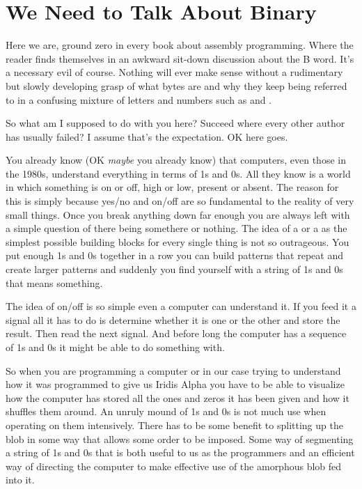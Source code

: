 \chapter{We Need to Talk About Binary} 
\lstset{style=6502Style}

Here we are, ground zero in every book about assembly programming. Where the reader
finds themselves in an awkward sit-down discussion about the B word. It's a necessary evil
of course. Nothing will ever make sense without a rudimentary but slowly developing
grasp of what bytes are and why they keep being referred to in a confusing mixture
of letters and numbers such as  and .

So what am I supposed to do with you here? Succeed where every other author has
usually failed? I assume that's the expectation. OK here goes.

You already know (OK \textit{maybe} you already know) that computers, even those in the 
1980s, understand everything in terms of 1s and 0s. All they know is a world
in which something is on or off, high or low, present or absent. The reason
for this is simply because yes/no and on/off are so fundamental to the reality
of very small things. Once you break anything down far enough you are always
left with a simple question of there being somethere or nothing. The idea of a
 or a  as the simplest possible building blocks for every
single thing is not so outrageous. You put enough 1s and 0s together in a row
you can build patterns that repeat and create larger patterns and suddenly
you find yourself with a string of 1s and 0s that means something.

The idea of on/off is so simple even a computer can understand it. If you feed
it a signal all it has to do is determine whether it is one or the other and
store the result. Then read the next signal. And before long the computer
has a sequence of 1s and 0s it might be able to do something with.

So when you are programming a computer or in our case trying to understand
how it was programmed to give us Iridis Alpha you have to be able to visualize
how the computer has stored all the ones and zeros it has been given and how
it shuffles them around. An unruly mound of 1s and 0s is not much use when
operating on them intensively. There has to be some benefit to splitting
up the blob in some way that allows some order to be imposed. Some way
of segmenting a string of 1s and 0s that is both useful to us as the
programmers and an efficient way of directing the computer to make effective
use of the amorphous blob fed into it.

